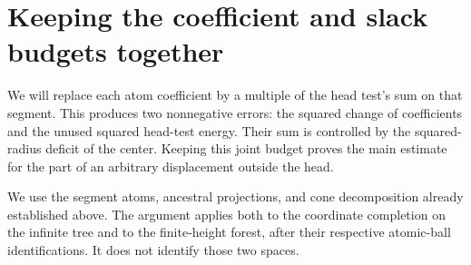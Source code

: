 \section{Keeping the coefficient and slack budgets together}
\label{mol:sec:joint-budget}

We will replace each atom coefficient by a multiple of the head test's
sum on that segment. This produces two nonnegative errors: the squared
change of coefficients and the unused squared head-test energy. Their
sum is controlled by the squared-radius deficit of the center. Keeping
this joint budget proves the main estimate for the part of an arbitrary
displacement outside the head.

We use the segment atoms, ancestral projections, and cone decomposition
already established above.  The argument applies both to the coordinate
completion on the infinite tree and to the finite-height forest, after
their respective atomic-ball identifications.  It does not identify those
two spaces.



